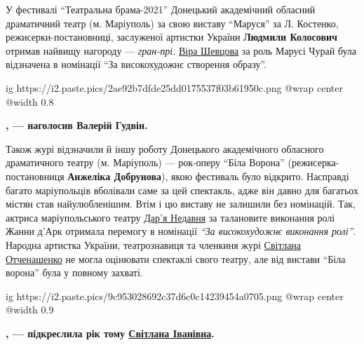 У фестивалі \enquote{Театральна брама-2021} Донецький академічний обласний
драматичний театр (м. Маріуполь) за свою виставу \enquote{Маруся} за Л.
Костенко, режисерки-постановниці, заслуженої артистки України \textbf{Людмили Колосович}
отримав найвищу нагороду — \emph{гран-прі.}
\href{https://www.facebook.com/profile.php?id=100023187227038}{Віра Шевцова} за
роль Марусі Чурай була відзначена в номінації \enquote{За високохудожнє
створення образу}.

\ifcmt
  ig https://i2.paste.pics/2ae92b7dfde25dd0175537f03b61950c.png
  @wrap center
  @width 0.8
\fi


\begin{leftbar}
	\begingroup
		\bfseries
{}, — наголосив Валерій Гудвін.
	\endgroup
\end{leftbar}

Також журі відзначили й іншу роботу Донецького академічного обласного
драматичного театру (м. Маріуполь) — рок-оперу \enquote{Біла Ворона}
(режисерка-постановниця \textbf{Анжеліка Добрунова}), якою фестиваль було відкрито.
Насправді багато маріупольців вболівали саме за цей спектакль, адже він давно
для багатьох містян став найулюбленішим. Втім і цю виставу не залишили без
номінацій. Так, актриса маріупольського театру \href{https://www.facebook.com/profile.php?id=100028732189242}{Дар'я Недавня} за талановите
виконання ролі Жанни д'Арк отримала перемогу в номінації \emph{\enquote{За високохудожнє
виконання ролі}}. Народна артистка України, театрознавиця та членкиня журі
\href{\urlSvitlanaIvanivnaOtchenashenkoIA}{Світлана Отченашенко} не могла оцінювати спектаклі свого театру, але від вистави
\enquote{Біла ворона} була у повному захваті. 

\ifcmt
  ig https://i2.paste.pics/9c953028692c37d6c0c14239454a0705.png
  @wrap center
  @width 0.9
\fi

\begin{leftbar}
	\begingroup
		\bfseries
{}, — підкреслила рік тому \href{\urlSvitlanaIvanivnaOtchenashenkoIA}{Світлана Іванівна}.
	\endgroup
\end{leftbar}

